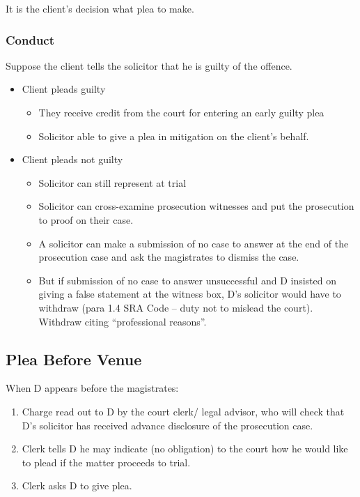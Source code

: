 \documentclass[
]{article}
\providecommand{\tightlist}{%
  \setlength{\itemsep}{0pt}\setlength{\parskip}{0pt}}
\begin{document}
It is the client's decision what plea to make.

\hypertarget{conduct}{%
\subsubsection{Conduct}\label{conduct}}

Suppose the client tells the solicitor that he is guilty of the offence.

\begin{itemize}
\tightlist
\item
  Client pleads guilty

  \begin{itemize}
  \tightlist
  \item
    They receive credit from the court for entering an early guilty plea
  \item
    Solicitor able to give a plea in mitigation on the client's behalf.
  \end{itemize}
\item
  Client pleads not guilty

  \begin{itemize}
  \tightlist
  \item
    Solicitor can still represent at trial
  \item
    Solicitor can cross-examine prosecution witnesses and put the
    prosecution to proof on their case.
  \item
    A solicitor can make a submission of no case to answer at the end of
    the prosecution case and ask the magistrates to dismiss the case.
  \item
    But if submission of no case to answer unsuccessful and D insisted
    on giving a false statement at the witness box, D's solicitor would
    have to withdraw (para 1.4 SRA Code -- duty not to mislead the
    court). Withdraw citing ``professional reasons''.
  \end{itemize}
\end{itemize}

\hypertarget{plea-before-venue}{%
\subsection{Plea Before Venue}\label{plea-before-venue}}

When D appears before the magistrates:

\begin{enumerate}
\def\labelenumi{\arabic{enumi}.}
\tightlist
\item
  Charge read out to D by the court clerk/ legal advisor, who will check
  that D's solicitor has received advance disclosure of the prosecution
  case.
\item
  Clerk tells D he may indicate (no obligation) to the court how he
  would like to plead if the matter proceeds to trial.
\item
  Clerk asks D to give plea.
\end{enumerate}
\end{document}
